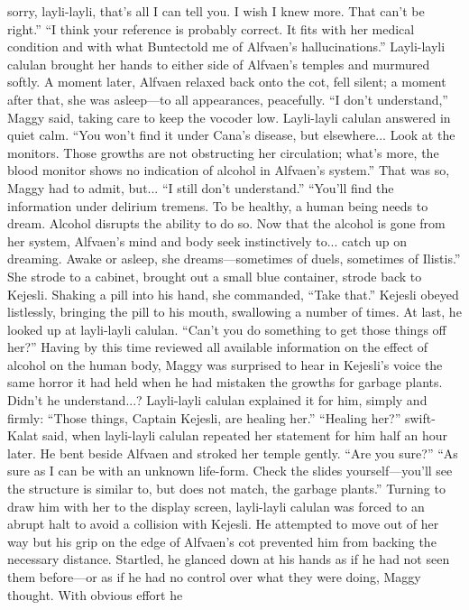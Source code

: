 \documentclass[9pt]{article}
\begin{document}
sorry, layli-layli, that’s all I can tell you. I wish I knew more. That can’t be right.”
“I think your reference is probably correct. It fits with her medical condition and with what Buntectold me of Alfvaen’s hallucinations.” Layli-layli calulan brought her hands to either side of Alfvaen’s
temples and murmured softly. A moment later, Alfvaen relaxed back onto the cot, fell silent; a moment
after that, she was asleep—to all appearances, peacefully.
“I don’t understand,” Maggy said, taking care to keep the vocoder low.
Layli-layli calulan answered in quiet calm. “You won’t find it under Cana’s disease, but
elsewhere... Look at the monitors. Those growths are not obstructing her circulation; what’s more, the
blood monitor shows no indication of alcohol in Alfvaen’s system.”
That was so, Maggy had to admit, but... “I still don’t understand.”
“You’ll find the information under delirium tremens. To be healthy, a human being needs to dream.
Alcohol disrupts the ability to do so. Now that the alcohol is gone from her system, Alfvaen’s mind and
body seek instinctively to... catch up on dreaming. Awake or asleep, she dreams—sometimes of duels,
sometimes of Ilistis.”
She strode to a cabinet, brought out a small blue container, strode back to Kejesli. Shaking a pill into
his hand, she commanded, “Take that.”
Kejesli obeyed listlessly, bringing the pill to his mouth, swallowing a number of times. At last, he
looked up at layli-layli calulan. “Can’t you do something to get those things off her?”
Having by this time reviewed all available information on the effect of alcohol on the human body,
Maggy was surprised to hear in Kejesli’s voice the same horror it had held when he had mistaken the
growths for garbage plants. Didn’t he understand...?
Layli-layli calulan explained it for him, simply and firmly: “Those things, Captain Kejesli, are
healing her.”
“Healing her?” swift-Kalat said, when layli-layli calulan repeated her statement for him half an hour
later. He bent beside Alfvaen and stroked her temple gently. “Are you sure?”
“As sure as I can be with an unknown life-form. Check the slides yourself—you’ll see the structure is
similar to, but does not match, the garbage plants.” Turning to draw him with her to the display screen,
layli-layli calulan was forced to an abrupt halt to avoid a collision with Kejesli.
He attempted to move out of her way but his grip on the edge of Alfvaen’s cot prevented him from
backing the necessary distance. Startled, he glanced down at his hands as if he had not seen them
before—or as if he had no control over what they were doing, Maggy thought. With obvious effort he
\end{document}
